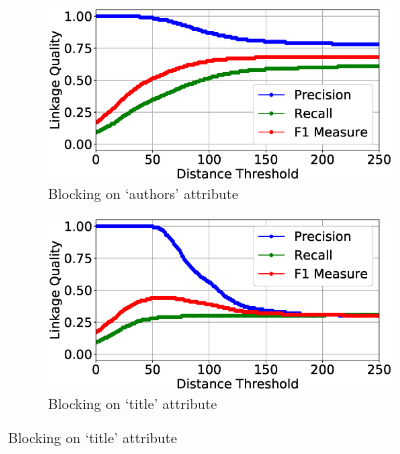 \documentclass{llncs}
\begin{document}
\begin{figure}
\begin{subfigure}{.5\textwidth}
  \centering
\includegraphics[width=\textwidth]{figures/plotLQ-cora-trad-authors}
\vspace{-6mm}
\caption{Blocking on `authors' attribute}
\end{subfigure}%
\begin{subfigure}{.5\textwidth}
  \centering
\includegraphics[width=\textwidth]{figures/plotLQ-cora-trad-title}
\vspace{-6mm}
\caption{Blocking on `title' attribute}
\end{subfigure} \vspace{5mm}


\end{figure}
\end{document}

